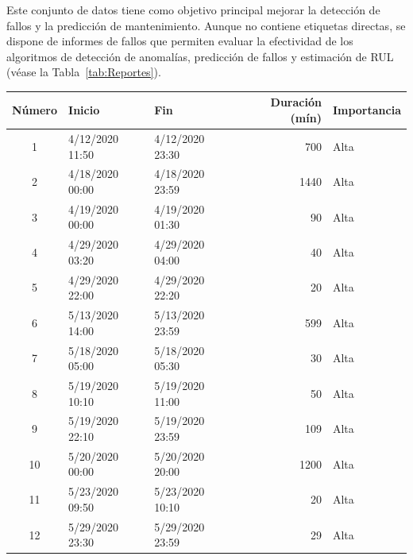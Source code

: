 \documentclass[12pt,letterpaper]{article}
\begin{document}
Este conjunto de datos tiene como objetivo principal mejorar la detección de fallos y la predicción de mantenimiento. 
Aunque no contiene etiquetas directas, se dispone de informes de fallos que permiten evaluar la efectividad de los algoritmos de detección de anomalías, predicción de fallos y estimación de RUL (véase la Tabla~\ref{tab:Reportes}).

\begin{table}[htp]
    \centering
\begin{tabular}{|c|l|l|r|l|}
\hline
\textbf{Número} & \textbf{Inicio}       & \textbf{Fin}         & \textbf{Duración (mín)} & \textbf{Importancia} \\ \hline
1            & 4/12/2020 11:50          & 4/12/2020 23:30           & 700                & Alta              \\ \hline
2            & 4/18/2020 00:00          & 4/18/2020 23:59           & 1440               & Alta              \\ \hline
3            & 4/19/2020 00:00          & 4/19/2020 01:30           & 90                 & Alta              \\ \hline
4            & 4/29/2020 03:20          & 4/29/2020 04:00           & 40                 & Alta              \\ \hline
5            & 4/29/2020 22:00          & 4/29/2020 22:20           & 20                 & Alta              \\ \hline
6            & 5/13/2020 14:00          & 5/13/2020 23:59           & 599                & Alta              \\ \hline
7            & 5/18/2020 05:00          & 5/18/2020 05:30           & 30                 & Alta              \\ \hline
8            & 5/19/2020 10:10          & 5/19/2020 11:00           & 50                 & Alta              \\ \hline
9            & 5/19/2020 22:10          & 5/19/2020 23:59           & 109                & Alta              \\ \hline
10           & 5/20/2020 00:00          & 5/20/2020 20:00           & 1200               & Alta              \\ \hline
11           & 5/23/2020 09:50          & 5/23/2020 10:10           & 20                 & Alta              \\ \hline
12           & 5/29/2020 23:30          & 5/29/2020 23:59           & 29                 & Alta              \\ \hline

\end{tabular}
\end{table}
\end{document}
